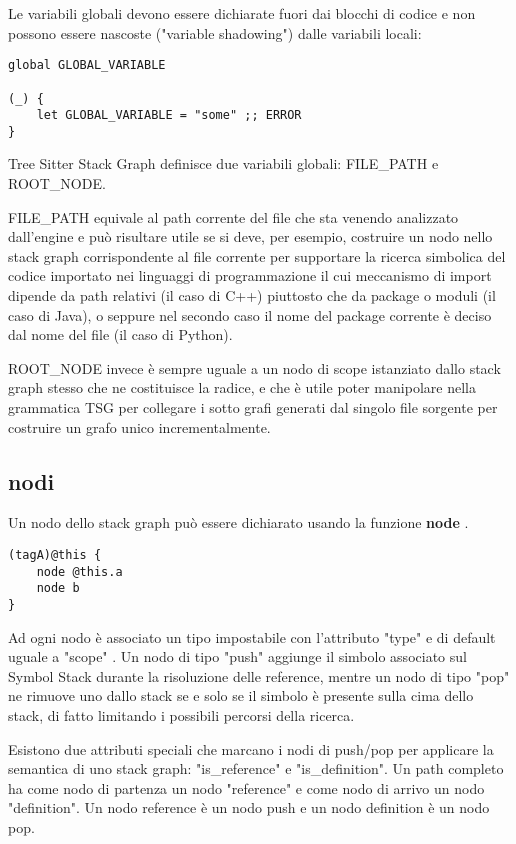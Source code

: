 Le variabili globali devono essere dichiarate fuori dai blocchi di codice e non possono essere nascoste ("variable shadowing") dalle variabili locali:

\begin{lstlisting}
global GLOBAL_VARIABLE

(_) {
    let GLOBAL_VARIABLE = "some" ;; ERROR
}
\end{lstlisting}

Tree Sitter Stack Graph definisce due variabili globali: FILE\_PATH e ROOT\_NODE.

FILE\_PATH equivale al path corrente del file che sta venendo analizzato dall'engine e pu\`o risultare utile se si deve, per esempio, costruire un nodo nello stack graph corrispondente al file corrente per supportare la ricerca simbolica del codice importato nei linguaggi di programmazione il cui meccanismo di import dipende da path relativi (il caso di C++) piuttosto che da package o moduli (il caso di Java), o seppure nel secondo caso il nome del package corrente \`e deciso dal nome del file (il caso di Python).

ROOT\_NODE invece \`e sempre uguale a un nodo di scope istanziato dallo stack graph stesso che ne costituisce la radice, e che \`e utile poter manipolare nella grammatica TSG per collegare i sotto grafi generati dal singolo file sorgente per costruire un grafo unico incrementalmente.

\subsection{nodi}

Un nodo dello stack graph pu\`o essere dichiarato usando la funzione \textbf{node} \cite{TreeSitterGraphReferenceGraphNodes}.

\begin{lstlisting}
(tagA)@this {
    node @this.a
    node b
}
\end{lstlisting}

Ad ogni nodo \`e associato un tipo impostabile con l'attributo "type" e di default uguale a "scope" \cite{TreeSitterStackGraphNodes}.
Un nodo di tipo "push" aggiunge il simbolo associato sul Symbol Stack durante la risoluzione delle reference, mentre un nodo di tipo "pop" ne rimuove uno dallo stack se e solo se il simbolo \`e presente sulla cima dello stack, di fatto limitando i possibili percorsi della ricerca.

Esistono due attributi speciali che marcano i nodi di push/pop per applicare la semantica di uno stack graph: "is\_reference" e "is\_definition".
Un path completo ha come nodo di partenza un nodo "reference" e come nodo di arrivo un nodo "definition".
Un nodo reference \`e un nodo push e un nodo definition \`e un nodo pop.

